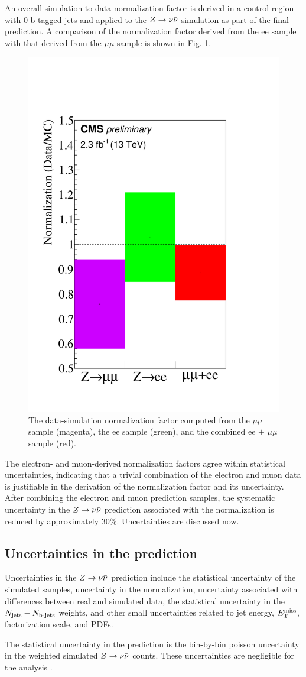 An overall simulation-to-data normalization factor is derived in a control region with 0 b-tagged jets and applied to the $Z\rightarrow \nu\bar{\nu}$ simulation as part of the final prediction. A comparison of the normalization factor derived from the ee sample with that derived from the $\mu\mu$ sample is shown in Fig. \ref{fig:ZInvNorm}.
\begin{figure}[tb!]
\centering
\includegraphics[width=0.4\linewidth]{figures/SusySearches/HadStop2015/NormFactors.pdf}
\caption{The data-simulation normalization factor computed from the $\mu\mu$ sample (magenta), the ee sample (green), and the combined ee $+$ $\mu\mu$ sample (red). }
\label{fig:ZInvNorm}
\end{figure}
\noindent
The electron- and muon-derived normalization factors agree within statistical uncertainties, indicating that a trivial combination of the electron and muon data is justifiable in the derivation of the normalization factor and its uncertainty. After combining the electron and muon prediction samples, the systematic uncertainty in the $Z\rightarrow \nu\bar{\nu}$ prediction associated with the normalization is reduced by approximately 30\%. Uncertainties are discussed now.

\FloatBarrier
\subsection{Uncertainties in the prediction}
Uncertainties in the $Z\rightarrow \nu\bar{\nu}$ prediction include the statistical uncertainty of the simulated samples, uncertainty in the normalization, uncertainty associated with differences between real and simulated data, the statistical uncertainty in the $N_{\rm jets}-N_{\text{b-jets}}$ weights, and other small uncertainties related to jet energy, $E_{\text{T}}^{\rm miss}$, factorization scale, and PDFs.  

The statistical uncertainty in the prediction is the bin-by-bin poisson uncertainty in the weighted simulated $Z\rightarrow \nu\bar{\nu}$ counts. These uncertainties are negligible for the analysis \cite{CMS:2016nhb}.

